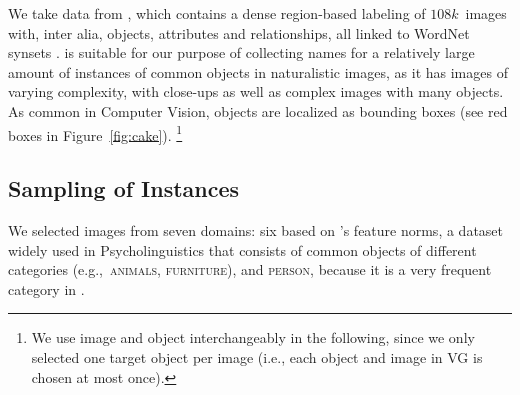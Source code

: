 

We take data from \vgenome \cite[\vg henceforth]{krishna2016visualgenome}, which
contains a dense region-based labeling of $108k$~images with, inter alia, objects, attributes and relationships,  %
all linked to WordNet synsets \cite{fellbaum1998wordnet}.
\vg is suitable for our purpose of collecting names for a relatively large amount of instances of common objects in
naturalistic images, as it has images of varying complexity, with close-ups as well as complex images with many objects.
As common in Computer Vision, objects are localized as 
 bounding boxes (see red boxes in Figure~\ref{fig:cake}).%
\footnote{We use image and object interchangeably in the following, since we only selected one target object per image (i.e., each object and image in VG is chosen at most once).}

\subsection{Sampling of Instances}

We selected images from seven domains: six based on 's \citeyear{mcrae2005semantic} feature norms, a dataset widely used in Psycholinguistics that consists of common objects of different categories (e.g.,~\textsc{animals}, \textsc{furniture}), and \textsc{person}, because it is a very frequent category in \vg.


